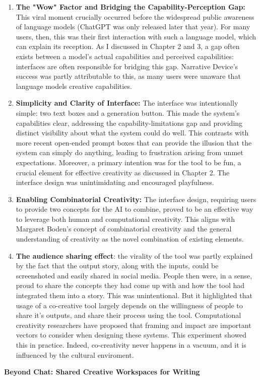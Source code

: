 \begin{enumerate}
    \item \textbf{The "Wow" Factor and Bridging the Capability-Perception Gap:} This viral moment crucially occurred before the widespread public awareness of language models (ChatGPT was only released later that year). For many users, then, this was their first interaction with such a language model, which can explain its reception. As I discussed in Chapter 2 and 3, a gap often exists between a model's actual capabilities and perceived capabilities: interfaces are often responsible for bridging this gap. Narrative Device's success was partly attributable to this, as many users were unaware that language models creative capabilities.
    \item \textbf{Simplicity and Clarity of Interface:} The interface was intentionally simple: two text boxes and a generation button. This made the system's capabilities clear, addressing the capability-limitations gap and providing distinct visibility about what the system could do well. This contrasts with more recent open-ended prompt boxes that can provide the illusion that the system can simply do anything, leading to frustration arising from unmet expectations. Moreover, a primary intention was for the tool to be fun, a crucial element for effective creativity as discussed in Chapter 2. The interface design was unintimidating and encouraged playfulness. 
    \item \textbf{Enabling Combinatorial Creativity:} The interface design, requiring users to provide two concepts for the AI to combine, proved to be an effective way to leverage both human and computational creativity. This aligns with Margaret Boden's concept of combinatorial creativity and the general understanding of creativity as the novel combination of existing elements.
    \item \textbf{The audience sharing effect}: the virality of the tool was partly explained by the fact that the output story, along with the inputs, could be screenshoted and easily shared in social media. People then were, in a sense, proud to share the concepts they had come up with and how the tool had integrated them into a story. This was unintentional. But it highlighted that usage of a co-creative tool largely depends on the willingness of people to share it's outputs, and share their process using the tool. Computational creativity researchers have proposed that framing and impact are important vectors to consider when designing these systems.\cite{Colton2011-uy, Jordanous2016-xb} This experiment showed this in practice. Indeed, co-creativity never happens in a vacuum, and it is influenced by the cultural enviroment. 
\end{enumerate}
\textbf{Beyond Chat: Shared Creative Workspaces for Writing}

